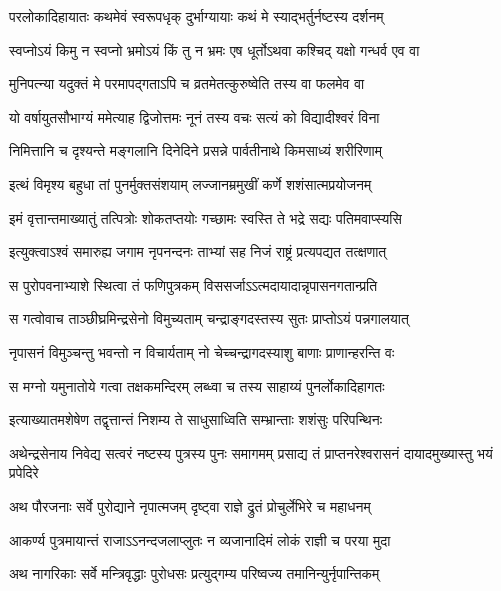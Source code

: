 \twolineshloka
{परलोकादिहायातः कथमेवं स्वरूपधृक्}
{दुर्भाग्यायाः कथं मे स्याद्भर्तुर्नष्टस्य दर्शनम्} %

\twolineshloka
{स्वप्नोऽयं किमु न स्वप्नो भ्रमोऽयं किं तु न भ्रमः}
{एष धूर्तोऽथवा कश्चिद् यक्षो गन्धर्व एव वा} %

\twolineshloka
{मुनिपत्न्या यदुक्तं मे परमापद्गताऽपि च}
{व्रतमेतत्कुरुष्वेति तस्य वा फलमेव वा} %

\twolineshloka
{यो वर्षायुतसौभाग्यं ममेत्याह द्विजोत्तमः}
{नूनं तस्य वचः सत्यं को विद्यादीश्वरं विना} %

\twolineshloka
{निमित्तानि च दृश्यन्ते मङ्गलानि दिनेदिने}
{प्रसन्ने पार्वतीनाथे किमसाध्यं शरीरिणाम्} %

\twolineshloka
{इत्थं विमृश्य बहुधा तां पुनर्मुक्तसंशयाम्}
{लज्जानम्रमुखीं कर्णे शशंसात्मप्रयोजनम्} %

\twolineshloka
{इमं वृत्तान्तमाख्यातुं तत्पित्रोः शोकतप्तयोः}
{गच्छामः स्वस्ति ते भद्रे सद्यः पतिमवाप्स्यसि} %

\twolineshloka
{इत्युक्त्वाऽश्वं समारुह्य जगाम नृपनन्दनः}
{ताभ्यां सह निजं राष्ट्रं प्रत्यपद्यत तत्क्षणात्} %

\twolineshloka
{स पुरोपवनाभ्याशे स्थित्वा तं फणिपुत्रकम्}
{विससर्जाऽऽत्मदायादान्नृपासनगतान्प्रति} %

\twolineshloka
{स गत्वोवाच ताञ्छीघ्रमिन्द्रसेनो विमुच्यताम्}
{चन्द्राङ्गदस्तस्य सुतः प्राप्तोऽयं पन्नगालयात्} %

\twolineshloka
{नृपासनं विमुञ्चन्तु भवन्तो न विचार्यताम्}
{नो चेच्चन्द्रागदस्याशु बाणाः प्राणान्हरन्ति वः} %

\twolineshloka
{स मग्नो यमुनातोये गत्वा तक्षकमन्दिरम्}
{लब्ध्वा च तस्य साहाय्यं पुनर्लोकादिहागतः} %

\twolineshloka
{इत्याख्यातमशेषेण तद्वृत्तान्तं निशम्य ते}
{साधुसाध्विति सम्भ्रान्ताः शशंसुः परिपन्थिनः} %

\fourlineindentedshloka
{अथेन्द्रसेनाय निवेद्य सत्वरं}
{नष्टस्य पुत्रस्य पुनः समागमम्}
{प्रसाद्य तं प्राप्तनरेश्वरासनं}
{दायादमुख्यास्तु भयं प्रपेदिरे} %

\twolineshloka
{अथ पौरजनाः सर्वे पुरोद्याने नृपात्मजम्}
{दृष्ट्वा राज्ञे द्रुतं प्रोचुर्लेभिरे च महाधनम्} %

\twolineshloka
{आकर्ण्य पुत्रमायान्तं राजाऽऽनन्दजलाप्लुतः}
{न व्यजानादिमं लोकं राज्ञी च परया मुदा} %

\twolineshloka
{अथ नागरिकाः सर्वे मन्त्रिवृद्धाः पुरोधसः}
{प्रत्युद्गम्य परिष्वज्य तमानिन्युर्नृपान्तिकम्} %

